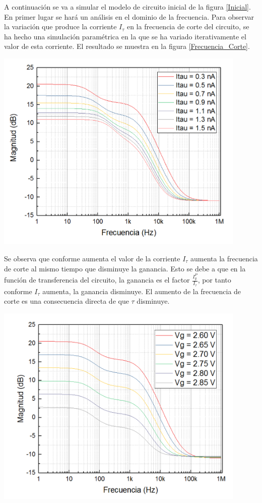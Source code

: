 	A continuación se va a simular el modelo de circuito inicial de la figura \ref{Inicial}. En primer lugar se hará un análisis en el dominio de la frecuencia. Para observar la variación que produce la corriente $I_{\tau}$ en la frecuencia de corte del circuito, se ha hecho una simulación paramétrica en la que se ha variado iterativamente el valor de esta corriente. El resultado se muestra en la figura \ref{Frecuencia_Corte}.
	
	
    \begin{center}
		\includegraphics[width=12cm]{Imagenes/Sinaptico/Inicial_Itau}
    		\label{Frecuencia_Corte}
	\end{center}	
	
	Se observa que conforme aumenta el valor de la corriente $I_{\tau}$ aumenta la frecuencia de corte al mismo tiempo que disminuye la ganancia. Esto se debe a que en la función de transferencia del circuito, la ganancia es el factor $\frac{I_g^P}{I_{\tau}}$, por tanto conforme $I_{\tau}$ aumenta, la ganancia disminuye. El aumento de la frecuencia de corte es una consecuencia directa de que $\tau$ disminuye.
	
		\begin{center}
		\includegraphics[width=12cm]{Imagenes/Sinaptico/Inicial_Vg}
    		\label{Inicial_Vg}
	\end{center}	
	
